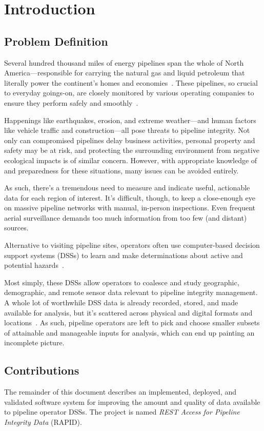 \chapter{Introduction}
\label{intro}

\section{Problem Definition}
\label{Problem}
Several hundred thousand miles of energy pipelines span the whole of North America---responsible for carrying the natural gas and liquid petroleum that literally power the continent's homes and economies~\cite{PHMSA}. These pipelines, so crucial to everyday goings-on, are closely monitored by various operating companies to ensure they perform safely and smoothly~\cite{PHMSA2013}.

Happenings like earthquakes, erosion, and extreme weather---and human factors like vehicle traffic and construction---all pose threats to pipeline integrity. Not only can compromised pipelines delay business activities, personal property and safety may be at risk, and protecting the surrounding environment from negative ecological impacts is of similar concern. However, with appropriate knowledge of and preparedness for these situations, many issues can be avoided entirely.

As such, there's a tremendous need to measure and indicate useful, actionable data for each region of interest. It's difficult, though, to keep a close-enough eye on massive pipeline networks with manual, in-person inspections. Even frequent aerial surveillance demands too much information from too few (and distant) sources.

Alternative to visiting pipeline sites, operators often use computer-based decision support systems (DSSs) to learn and make determinations about active and potential hazards~\cite{PHMSA2013,Dunning2013}. 

Most simply, these DSSs allow operators to coalesce and study geographic, demographic, and remote sensor data relevant to pipeline integrity management. A whole lot of worthwhile DSS data is already recorded, stored, and made available for analysis, but it's scattered across physical and digital formats and locations~\cite{Dunning2013}. As such, pipeline operators are left to pick and choose smaller subsets of attainable and manageable inputs for analysis, which can end up painting an incomplete picture.

\section{Contributions}
The remainder of this document describes an implemented, deployed, and validated software system for improving the amount and quality of data available to pipeline operator DSSs. The project is named \textit{REST Access for Pipeline Integrity Data} (RAPID).

